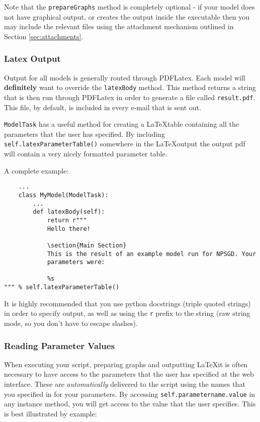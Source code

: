 \documentclass{article}
\newcommand{\mpath}[1]{\texttt{#1}}
\newcommand{\mclass}[1]{\texttt{#1}}
\begin{document}
Note that the \texttt{prepareGraphs} method is completely optional - if your
model does not have graphical output, or creates the output inside the
executable then you may include the relevant files using the attachment mechanism
outlined in Section \ref{sec:attachments}.


\subsubsection{Latex Output}
\label{sec:LatexOutput}
Output for all models is generally routed through PDFLatex. Each model will
\textbf{definitely} want to override the \texttt{latexBody} method. This method
returns a string that is then run through PDFLatex in order to generate a file
called \mpath{result.pdf}. This file, by default, is included in every e-mail
that is sent out.

\mclass{ModelTask} has a useful method for creating a \LaTeX table containing
all the parameters that the user has specified. By including
\texttt{self.latexParameterTable()} somewhere in the \LaTeX output the output
pdf will contain a very nicely formatted parameter table.

A complete example:
\begin{lstlisting}
    ...
    class MyModel(ModelTask):
        ...
        def latexBody(self):
            return r"""
            Hello there!

            \section{Main Section}
            This is the result of an example model run for NPSGD. Your
            parameters were:

            %s
""" % self.latexParameterTable()
\end{lstlisting}

It is highly recommended that you use python docstrings (triple quoted strings)
in order to specify output, as well as using the \texttt{r} prefix to the string
(raw string mode, so you don't have to escape slashes).

\subsubsection{Reading Parameter Values}
When executing your script, preparing graphs and outputting \LaTeX it is often
necessary to have access to the parameters that the user has specified at the
web interface. These are \textit{automatically} delivered to the script using
the names that you specified in for your parameters. By accessing
\texttt{self.parametername.value} in any instance method, you will get access to
the value that the user specifies. This is best illustrated by example:
\end{document}
